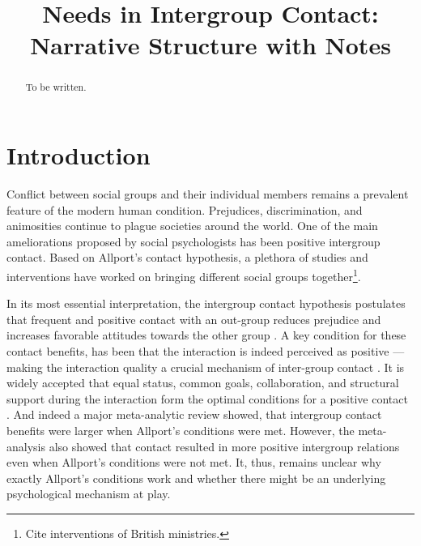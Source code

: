\documentclass[nobib]{tufte-handout}
\title[Needs in Intergroup Contact - Narrative]{Needs in Intergroup Contact: \\
Narrative Structure with Notes}
\author[Kreienkamp et al.]{}
\date{}  %
\theoremstyle{break}
\theoremstyle{plain}
\begin{document}
\maketitle %

\begin{abstract}
\noindent{} To be written.
\end{abstract}


\section{Introduction}
 Conflict between social groups and their individual members remains a prevalent feature of the modern human condition. Prejudices, discrimination, and animosities continue to plague societies around the world. One of the main ameliorations proposed by social psychologists has been positive intergroup contact. Based on Allport's \citeyear{Allport1954b} contact hypothesis, a plethora of studies and interventions have worked on bringing different social groups together\footnote{Cite interventions of British ministries.}. 

In its most essential interpretation, the intergroup contact hypothesis postulates that frequent and positive contact with an out-group reduces prejudice and increases favorable attitudes towards the other group \citep[e.g.,][]{Hewstone1996, Pettigrew1998}. A key condition for these contact benefits, has been that the interaction is indeed perceived as positive --- making the interaction quality a crucial mechanism of inter-group contact \citep[e.g.,][]{MacInnis2015}. It is widely accepted that equal status, common goals, collaboration, and structural support during the interaction form the optimal conditions for a positive contact \citep[Allport's Optimal Contact conditions,][]{Allport1954b}. And indeed a major meta-analytic review showed, that intergroup contact benefits were larger when Allport's conditions were met. However, the meta-analysis also showed that contact resulted in more positive intergroup relations even when Allport's conditions were not met. It, thus, remains unclear why exactly Allport's conditions work and whether there might be an underlying psychological mechanism at play.
\end{document}
